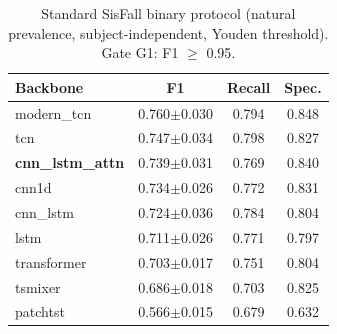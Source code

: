\begin{table}[!t]
\centering
\caption{Standard SisFall binary protocol (natural prevalence, subject-independent, Youden threshold). Gate G1: F1 $\ge$ 0.95.}
\label{tab:standardprotocol}
\begin{tabular}{lccc}
\toprule
Backbone & F1 & Recall & Spec. \\
\midrule
modern\_tcn & 0.760$\pm$0.030 & 0.794 & 0.848 \\
tcn & 0.747$\pm$0.034 & 0.798 & 0.827 \\
\textbf{cnn\_lstm\_attn} & 0.739$\pm$0.031 & 0.769 & 0.840 \\
cnn1d & 0.734$\pm$0.026 & 0.772 & 0.831 \\
cnn\_lstm & 0.724$\pm$0.036 & 0.784 & 0.804 \\
lstm & 0.711$\pm$0.026 & 0.771 & 0.797 \\
transformer & 0.703$\pm$0.017 & 0.751 & 0.804 \\
tsmixer & 0.686$\pm$0.018 & 0.703 & 0.825 \\
patchtst & 0.566$\pm$0.015 & 0.679 & 0.632 \\
\bottomrule
\end{tabular}
\end{table}

